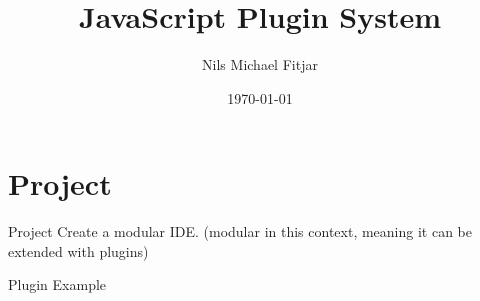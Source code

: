 \documentclass[UKenglish]{beamer}
\title{JavaScript Plugin System}
\author{Nils Michael Fitjar}
\date{\today}
\begin{document}
\frame{\titlepage}

\section{Project}
\begin{frame}{Project}
  Create a modular IDE.
  (modular in this context, meaning it can be extended with plugins)
\end{frame}

\begin{frame}{Plugin Example}
  \center 
\end{frame}
\end{document}
